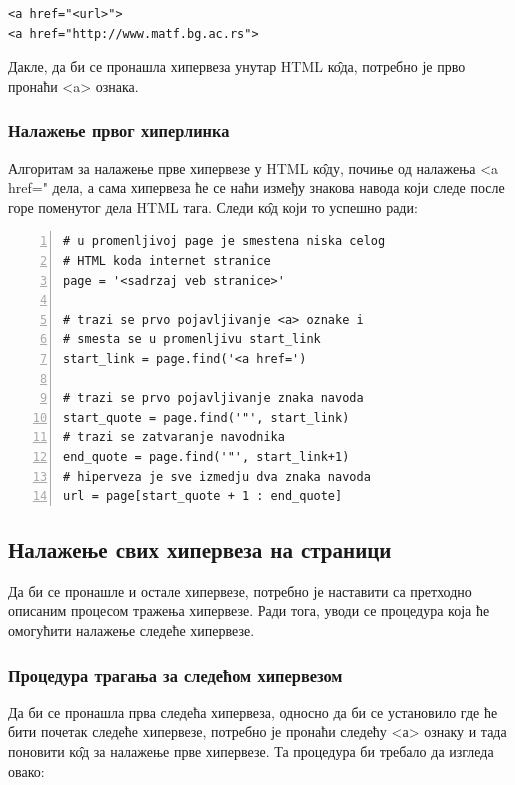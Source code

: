 \begin{lstlisting}[caption = <a> ознака, label = a_tag]
<a href="<url>">
<a href="http://www.matf.bg.ac.rs">
\end{lstlisting}

Дакле, да би се пронашла хипервеза унутар HTML к\^{о}да, потребно је прво пронаћи <a> ознака.

\subsubsection{Налажење првог хиперлинка}

Алгоритам за налажење прве хипервезе у HTML к\^{о}ду, почиње од налажења <a href=" дела, а сама хипервеза ће се наћи између знакова навода који следе после горе поменутог дела HTML тага. Следи к\^{о}д који то успешно ради:

\begin{lstlisting}[caption = Налажење првог хиперлинка, label = {lst:first_url}, numbers = left]
# u promenljivoj page je smestena niska celog
# HTML koda internet stranice
page = '<sadrzaj veb stranice>'

# trazi se prvo pojavljivanje <a> oznake i
# smesta se u promenljivu start_link
start_link = page.find('<a href=')

# trazi se prvo pojavljivanje znaka navoda
start_quote = page.find('"', start_link)
# trazi se zatvaranje navodnika
end_quote = page.find('"', start_link+1)
# hiperveza je sve izmedju dva znaka navoda
url = page[start_quote + 1 : end_quote]
\end{lstlisting}

\subsection{Налажење свих хипервеза на страници}

Да би се пронашле и остале хипервезе, потребно је наставити са претходно описаним процесом тражења хипервезе. Ради тога, уводи се процедура која ће омогућити налажење следеће хипервезе.

\subsubsection{Процедура трагања за следећом хипервезом}

Да би се пронашла прва следећа хипервеза, односно да би се установило где ће бити почетак следеће хипервезе, потребно је пронаћи следећу <а> ознаку и тада поновити к\^{о}д за налажење прве хипервезе. Та процедура би требало да изгледа овако:

